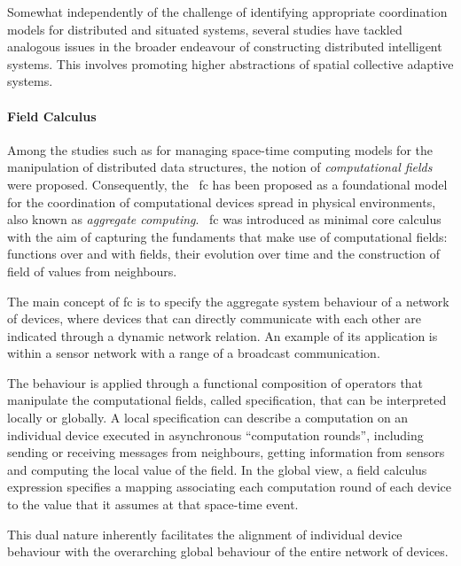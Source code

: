 Somewhat independently of the challenge of identifying appropriate coordination models for distributed and situated systems,
several studies have tackled analogous issues in the broader endeavour of constructing distributed intelligent systems.
This involves promoting higher abstractions of spatial collective adaptive systems.

\paragraph{Field Calculus}
Among the studies such as for managing space-time computing models for the manipulation of distributed data structures,
the notion of \emph{computational fields} were proposed.
Consequently, the ~\ac{fc} has been proposed as a foundational model for the coordination of computational
devices spread in physical environments, also known as \emph{aggregate computing}.
~\ac{fc} was introduced as minimal core calculus with the aim of capturing the fundaments that make use of computational
fields: functions over and with fields, their evolution over time and the construction of field of values from neighbours.

The main concept of \ac{fc} is to specify the aggregate system behaviour of a network of devices, where devices that can
directly communicate with each other are indicated through a dynamic network relation.
An example of its application is within a sensor network with a range of a broadcast communication.

The behaviour is applied through a functional composition of operators that manipulate the computational fields,
called specification, that can be interpreted locally or globally.
A local specification can describe a computation on an individual device executed in asynchronous ``computation rounds'',
including sending or receiving messages from neighbours, getting information from sensors and computing the local value of the field.
In the global view, a field calculus expression specifies a mapping associating each computation round of each device to
the value that it assumes at that space-time event.

This dual nature inherently facilitates the alignment of individual device behaviour with the overarching global behaviour
of the entire network of devices.

